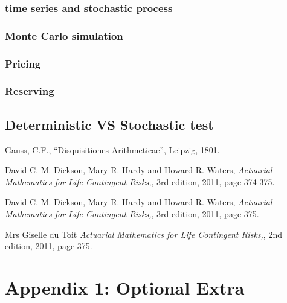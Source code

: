 \documentclass{report}
\begin{document}
\subsection{time series and stochastic process}
\subsection{Monte Carlo simulation}
\subsection{Pricing}
\subsection{Reserving}



\section{Deterministic VS Stochastic test}






\begin{thebibliography}{99}             %

 Gauss, C.F.,
    ``Disquisitiones Arithmeticae'', Leipzig, 1801.

  David C. M. Dickson, Mary R. Hardy and Howard R. Waters,
    {\em Actuarial Mathematics for Life Contingent Risks,},
    3rd edition, 2011, 
    page 374-375.

  David C. M. Dickson, Mary R. Hardy and Howard R. Waters,
    {\em Actuarial Mathematics for Life Contingent Risks,},
    3rd edition, 2011, 
    page 375.



  Mrs Giselle du Toit
    {\em Actuarial Mathematics for Life Contingent Risks,},
    2nd edition, 2011, 
    page 375.




\end{thebibliography}


\chapter*{Appendix 1: Optional Extra}
\end{document}
